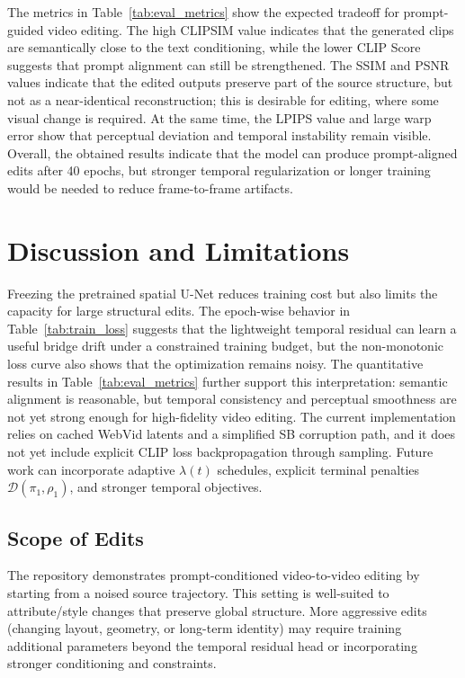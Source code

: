 \documentclass[journal]{IEEEtran}
\begin{document}
The metrics in Table~\ref{tab:eval_metrics} show the expected tradeoff for prompt-guided video editing. The high CLIPSIM value indicates that the generated clips are semantically close to the text conditioning, while the lower CLIP Score suggests that prompt alignment can still be strengthened. The SSIM and PSNR values indicate that the edited outputs preserve part of the source structure, but not as a near-identical reconstruction; this is desirable for editing, where some visual change is required. At the same time, the LPIPS value and large warp error show that perceptual deviation and temporal instability remain visible. Overall, the obtained results indicate that the model can produce prompt-aligned edits after 40 epochs, but stronger temporal regularization or longer training would be needed to reduce frame-to-frame artifacts.




\section{Discussion and Limitations}
Freezing the pretrained spatial U-Net reduces training cost but also limits the capacity for large structural edits. The epoch-wise behavior in Table~\ref{tab:train_loss} suggests that the lightweight temporal residual can learn a useful bridge drift under a constrained training budget, but the non-monotonic loss curve also shows that the optimization remains noisy. The quantitative results in Table~\ref{tab:eval_metrics} further support this interpretation: semantic alignment is reasonable, but temporal consistency and perceptual smoothness are not yet strong enough for high-fidelity video editing. The current implementation relies on cached WebVid latents and a simplified SB corruption path, and it does not yet include explicit CLIP loss backpropagation through sampling. Future work can incorporate adaptive $\lambda(t)$ schedules, explicit terminal penalties $\mathcal{D}(\pi_1,\rho_1)$, and stronger temporal objectives.

\subsection{Scope of Edits}
The repository demonstrates prompt-conditioned video-to-video editing by starting from a noised source trajectory. This setting is well-suited to attribute/style changes that preserve global structure. More aggressive edits (changing layout, geometry, or long-term identity) may require training additional parameters beyond the temporal residual head or incorporating stronger conditioning and constraints.
\end{document}
